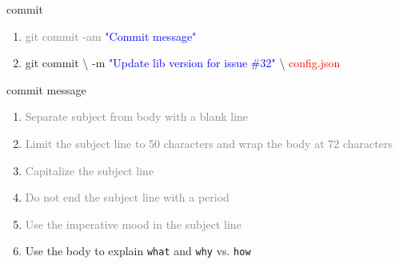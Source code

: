 \documentclass{beamer}
\begin{document}
\begin{frame}{commit}
    \begin{enumerate}[\$]
        \item<1-> \Large{\textcolor<3->{gray}{git commit -am \textcolor<2>{blue}{"Commit message"}}}
        \item<3-> \Large{git commit {\textbackslash}\newline 
            -m \textcolor<4->{blue}{"Update lib version for issue \#32"} {\textbackslash}\newline 
            \textcolor<5->{red}{config.json}}
    \end{enumerate}
\end{frame}

\begin{frame}[t]{commit message}
    \begin{enumerate}
        \item<1-> \textcolor<3->{gray}{Separate subject from body with a blank line}
        \item<3-> \textcolor<6->{gray}{Limit the subject line to 50 characters \newline 
            and wrap the body at 72 characters}
        \item<6-> \textcolor<9->{gray}{Capitalize the subject line}
        \item<9-> \textcolor<10->{gray}{Do not end the subject line with a period}
        \item<10-> \textcolor<13->{gray}{Use the imperative mood in the subject line}
        \item<13-> Use the body to explain \texttt{what} and \texttt{why} vs. \texttt{how}
    \end{enumerate}





\end{frame}
\end{document}

